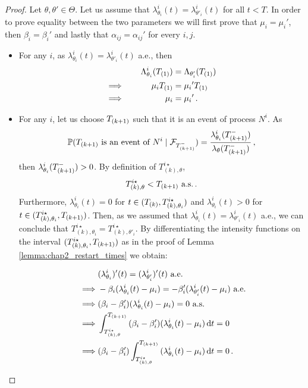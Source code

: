 \begin{subappendices}
\begin{proof}
      Let $\theta, \theta'\in \Theta$. Let us assume that $\lambda_{\theta_i}^i(t) = \lambda_{\theta'_i}^i(t)$ for all $t < T$. In order to prove equality between the two parameters we will first prove that $\mu_i = {\mu_i}'$, then $\beta_i = \beta_i'$ and lastly that $\alpha_{ij} = \alpha_{ij}'$ for every $i,j$. 
      
      \begin{itemize}
          \item For any $i$, as $\lambda_{\theta_i}^i(t) = \lambda_{\theta'_i}^i(t)$ a.e., then 
          \begin{alignat*}{2}
              &\quad& \Lambda_{\theta_i}^i(T\park[1]) &= \Lambda_{\theta'_i}(T\park[1])\\
              \implies && \mu_i T\park[1] &= {\mu_i}' T\park[1]\\
              \implies && \mu_i &= {\mu_i}'\,.
          \end{alignat*}
          
          \item For any $i$, let us choose $T\park[k+1]$ such that it is an event of process $N^i$. 
          As \[\PP(T\park[k+1] \text{ is an event of }N^i \mid \mathcal{F}_{T\park[k+1]^-}) = \frac{\lambda^i_{\theta_i}(T\park[k+1]^-)}{\lambda_{\theta}(T\park[k+1]^-)}\,,\]
          then $\lambda_{\theta_i}^i(T\park[k+1]^-) > 0$.
          By definition of $T_{(k),\theta}^{i\star}$, \[T_{(k),\theta}^{i\star} < T\park[k+1] \text{ a.s.} \,.\]
          Furthermore, $\lambda_{\theta_i}^i(t) = 0$ for $t\in(T\park, T_{(k), \theta_i}^{i\star})$ and $\lambda_{\theta_i}^i(t) > 0$ for $t\in(T_{(k), \theta_i}^{i\star}, T\park[k+1])$.
          Then, as we assumed that $\lambda_{\theta_i}^i(t) = \lambda_{\theta'_i}^i(t)$ a.e., we can conclude that $T_{(k), \theta_i}^{i\star} = T_{(k), \theta'_i}^{i\star}$. 
          By differentiating the intensity functions on the interval $(T_{(k),\theta_i}^{i\star}, T\park[k+1])$ as in the proof of Lemma \ref{lemma:chap2_restart_times} we obtain: 
          
          \begin{align*}
              \quad&(\lambda_{\theta_i}^i)'(t) = (\lambda_{\theta'_i}^i)'(t) \text{ a.e.}\\ 
              \implies &-\beta_i(\lambda_{\theta_i}^i(t) - \mu_i) =  -\beta_i'(\lambda_{\theta'_i}^i(t) - \mu_i) \text{ a.e.} \\
              \implies &(\beta_i - \beta_i')(\lambda_{\theta_i}^i(t) - \mu_i) = 0  \text{ a.s.}\\\
              \implies &\int_{T_{(k), \theta}^{i\star}}^{T\park[k+1]}{(\beta_i - \beta_i')(\lambda_{\theta_i}^i(t) - \mu_i)\,\mathrm{d}t} = 0\\
              \implies &(\beta_i - \beta_i')\int_{T_{(k), \theta}^{i\star}}^{T\park[k+1]}{(\lambda_{\theta_i}^i(t) - \mu_i)\,\mathrm{d}t} = 0\,.
          \end{align*}
          

\end{itemize}
\end{proof}
\end{subappendices}
